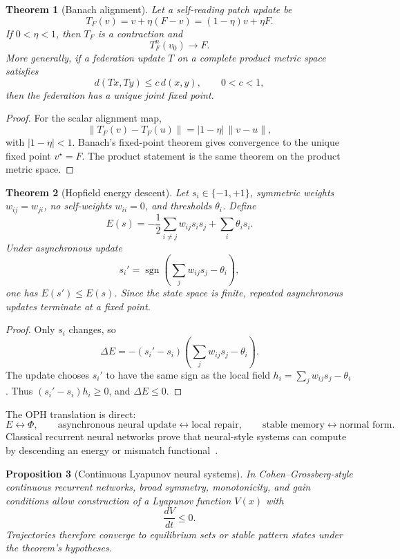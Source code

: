 \documentclass[11pt]{article}
\newtheorem{theorem}{Theorem}[section]
\newtheorem{proposition}[theorem]{Proposition}
\theoremstyle{remark}
\theoremstyle{plain}
\begin{document}
\begin{theorem}[Banach alignment]
Let a self-reading patch update be
\[
T_F(v)=v+\eta(F-v)=(1-\eta)v+\eta F.
\]
If \(0<\eta<1\), then \(T_F\) is a contraction and
\[
T_F^n(v_0)\to F.
\]
More generally, if a federation update \(T\) on a complete product metric space satisfies
\[
d(Tx,Ty)\le c\,d(x,y),
\qquad 0<c<1,
\]
then the federation has a unique joint fixed point.
\end{theorem}

\begin{proof}
For the scalar alignment map,
\[
\|T_F(v)-T_F(u)\|=|1-\eta|\,\|v-u\|,
\]
with \(|1-\eta|<1\). Banach's fixed-point theorem gives convergence to the unique fixed point \(v^\star=F\). The product statement is the same theorem on the product metric space.
\end{proof}

\begin{theorem}[Hopfield energy descent]
Let \(s_i\in\{-1,+1\}\), symmetric weights \(w_{ij}=w_{ji}\), no self-weights \(w_{ii}=0\), and thresholds \(\theta_i\). Define
\[
E(s)=
-\frac12\sum_{i\ne j}w_{ij}s_i s_j
+\sum_i\theta_i s_i.
\]
Under asynchronous update
\[
s_i'=\operatorname{sgn}\!\left(\sum_j w_{ij}s_j-\theta_i\right),
\]
one has \(E(s')\le E(s)\). Since the state space is finite, repeated asynchronous updates terminate at a fixed point.
\end{theorem}

\begin{proof}
Only \(s_i\) changes, so
\[
\Delta E
=
-(s_i'-s_i)
\left(
\sum_jw_{ij}s_j-\theta_i
\right).
\]
The update chooses \(s_i'\) to have the same sign as the local field \(h_i=\sum_jw_{ij}s_j-\theta_i\). Thus \((s_i'-s_i)h_i\ge0\), and \(\Delta E\le0\).
\end{proof}

The OPH translation is direct:
\[
E\leftrightarrow\Phi,
\qquad
\text{asynchronous neural update}\leftrightarrow\text{local repair},
\qquad
\text{stable memory}\leftrightarrow\text{normal form}.
\]
Classical recurrent neural networks prove that neural-style systems can compute by descending an energy or mismatch functional~\cite{Hopfield1982}.

\begin{proposition}[Continuous Lyapunov neural systems]
In Cohen--Grossberg-style continuous recurrent networks, broad symmetry, monotonicity, and gain conditions allow construction of a Lyapunov function \(V(x)\) with
\[
\frac{dV}{dt}\le0.
\]
Trajectories therefore converge to equilibrium sets or stable pattern states under the theorem's hypotheses.
\end{proposition}
\end{document}
